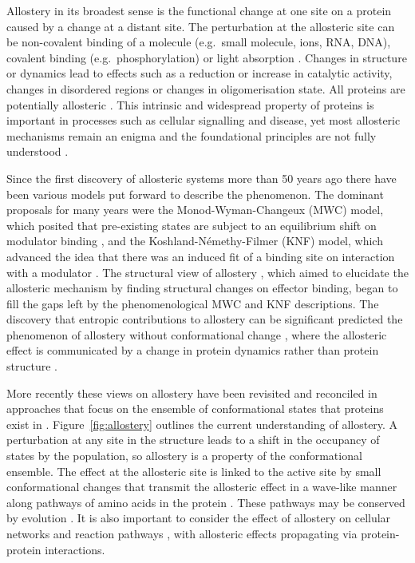 Allostery in its broadest sense is the functional change at one site on a protein caused by a change at a distant site.
The perturbation at the allosteric site can be non-covalent binding of a molecule (e.g.\ small molecule, ions, RNA, DNA), covalent binding (e.g.\ phosphorylation) or light absorption \cite{Nussinov2013}.
Changes in structure or dynamics lead to effects such as a reduction or increase in catalytic activity, changes in disordered regions or changes in oligomerisation state.
All proteins are potentially allosteric \cite{Gunasekaran2004}.
This intrinsic and widespread property of proteins is important in processes such as cellular signalling and disease, yet most allosteric mechanisms remain an enigma and the foundational principles are not fully understood \cite{Motlagh2014}.

Since the first discovery of allosteric systems more than 50 years ago there have been various models put forward to describe the phenomenon.
The dominant proposals for many years were the Monod-Wyman-Changeux (MWC) model, which posited that pre-existing states are subject to an equilibrium shift on modulator binding \cite{Monod1965}, and the Koshland-N\'{e}methy-Filmer (KNF) model, which advanced the idea that there was an induced fit of a binding site on interaction with a modulator \cite{Koshland1966}.
The structural view of allostery \cite{Perutz1970}, which aimed to elucidate the allosteric mechanism by finding structural changes on effector binding, began to fill the gaps left by the phenomenological MWC and KNF descriptions.
The discovery that entropic contributions to allostery can be significant predicted the phenomenon of allostery without conformational change \cite{Cooper1984}, where the allosteric effect is communicated by a change in protein dynamics rather than protein structure \cite{Motlagh2014}.

More recently these views on allostery have been revisited and reconciled in approaches that focus on the ensemble of conformational states that proteins exist in \cite{Motlagh2014, Hilser2012, Cui2008, Tsai2014}.
Figure~\ref{fig:allostery} outlines the current understanding of allostery.
A perturbation at any site in the structure leads to a shift in the occupancy of states by the population, so allostery is a property of the conformational ensemble.
The effect at the allosteric site is linked to the active site by small conformational changes that transmit the allosteric effect in a wave-like manner along pathways of amino acids in the protein \cite{DelSol2009}.
These pathways may be conserved by evolution \cite{Suel2003}.
It is also important to consider the effect of allostery on cellular networks and reaction pathways \cite{Nussinov2013}, with allosteric effects propagating via protein-protein interactions.

